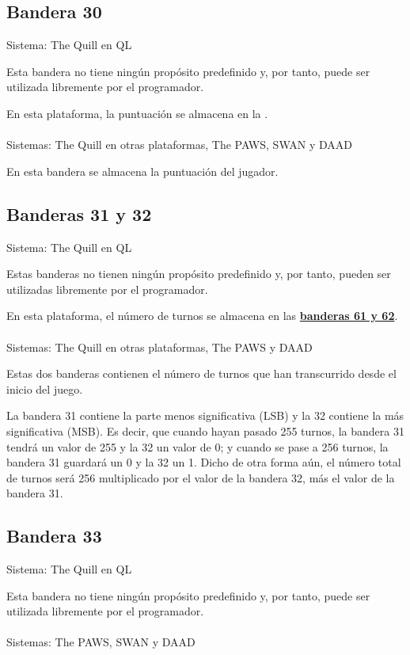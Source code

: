 \documentclass[11pt, a5paper]{article}
\newcommand{\quill}{\textsf{The Quill}\xspace}
\newcommand{\paw}{\textsf{The PAWS}\xspace}
\newcommand{\swan}{\textsf{SWAN}\xspace}
\newcommand{\daad}{\textsf{DAAD}\xspace}
\newcommand{\sistema}[1]{\noindent Sistema: #1 \nopagebreak}
\newcommand{\sistemas}[1]{\noindent Sistemas: #1 \nopagebreak}
\begin{document}
\subsection{Bandera 30}

\sistema{\quill en QL}

Esta bandera no tiene ningún propósito predefinido y, por tanto, puede ser utilizada libremente por el programador.

En esta plataforma, la puntuación se almacena en la \textbf{}.
\\\ \\
\sistemas{\quill en otras plataformas, \paw, \swan y \daad}

En esta bandera se almacena la puntuación del jugador.

\subsection{Banderas 31 y 32}

\sistema{\quill en QL}

Estas banderas no tienen ningún propósito predefinido y, por tanto, pueden ser utilizadas libremente por el programador.

En esta plataforma, el número de turnos se almacena en las \hyperref[flag61]{\textbf{banderas 61 y 62}}.
\\\ \\
\sistemas{\quill en otras plataformas, \paw y \daad}

Estas dos banderas contienen el número de turnos que han transcurrido desde el inicio del juego.

La bandera 31 contiene la parte menos significativa (LSB) y la 32 contiene la más significativa (MSB). Es decir, que cuando hayan pasado 255 turnos, la bandera 31 tendrá un valor de 255 y la 32 un valor de 0; y cuando se pase a 256 turnos, la bandera 31 guardará un 0 y la 32 un 1. Dicho de otra forma aún, el número total de turnos será 256 multiplicado por el valor de la bandera 32, más el valor de la bandera 31.

\subsection{Bandera 33}

\sistema{\quill en QL}

Esta bandera no tiene ningún propósito predefinido y, por tanto, puede ser utilizada libremente por el programador.
\\\ \\
\sistemas{\paw, \swan y \daad}
\end{document}
